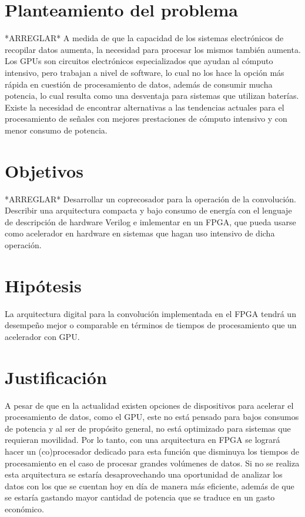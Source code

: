 \section{Planteamiento del problema}
*ARREGLAR* 
A medida de que la capacidad de los sistemas electrónicos de recopilar datos aumenta, la necesidad para procesar los mismos también aumenta. Los GPUs son circuitos electrónicos especializados que ayudan al cómputo intensivo, pero trabajan a nivel de software, lo cual no los hace la opción más rápida en cuestión de procesamiento de datos, además de consumir mucha potencia, lo cual resulta como una desventaja para sistemas que utilizan baterías. Existe la necesidad de encontrar alternativas a las tendencias actuales para el procesamiento de señales con mejores prestaciones de cómputo intensivo y con menor consumo de potencia.\\

\section{Objetivos}
*ARREGLAR* 
Desarrollar un coprecosador para la operación de la convolución. Describir una arquitectura compacta y bajo consumo de energía con el lenguaje de descripción de hardware Verilog e imlementar en un FPGA, que pueda usarse como acelerador en hardware en sistemas que hagan uso intensivo de dicha operación.\\

\section{Hipótesis}
La arquitectura digital para la convolución implementada en el FPGA tendrá un desempeño mejor o comparable en términos de tiempos de procesamiento que un acelerador con GPU. \\


\section{Justificación}
A pesar de que en la actualidad existen opciones de dispositivos para acelerar el procesamiento de datos, como el GPU, este no está pensado para bajos consumos de potencia y al ser de propósito general, no está optimizado para sistemas que requieran movilidad. Por lo tanto, con una  arquitectura en FPGA se logrará hacer un (co)procesador dedicado para esta función que disminuya los tiempos de procesamiento en el caso de procesar grandes volúmenes de datos. Si no se realiza esta arquitectura se estaría desaprovechando una oportunidad de analizar los datos con los que se cuentan hoy en día de manera más eficiente, además de que se estaría gastando mayor cantidad de potencia que se traduce en un gasto económico.\\

